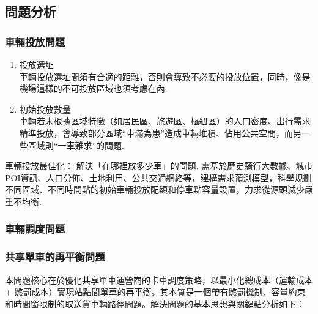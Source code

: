 \subsection{問題分析}
\subsubsection{車輛投放問題}
\begin{enumerate}
    \item 投放選址\\
    車輛投放選址間須有合適的距離，否則會導致不必要的投放位置，同時，像是機場這樣的不可投放區域也須考慮在內.
    \item 初始投放數量\\
    車輛若未根據區域特徵（如居民區、旅遊區、樞紐區）的人口密度、出行需求精準投放，會導致部分區域“車滿為患”造成車輛堆積、佔用公共空間，而另一些區域則“一車難求”的問題.
\end{enumerate}
車輛投放最佳化： 解決「在哪裡放多少車」的問題. 需基於歷史騎行大數據、城市POI資訊、人口分佈、土地利用、公共交通網絡等，建構需求預測模型，科學規劃不同區域、不同時間點的初始車輛投放配額和停車點容量設置，力求從源頭減少嚴重不均衡.
  
\subsubsection{車輛調度問題}

\subsubsection{共享單車的再平衡問題}
本問題核心在於優化共享單車運營商的卡車調度策略，以最小化總成本（運輸成本 + 懲罰成本）實現站點間單車的再平衡。其本質是一個帶有懲罰機制、容量約束和時間窗限制的取送貨車輛路徑問題。解決問題的基本思想與關鍵點分析如下：


